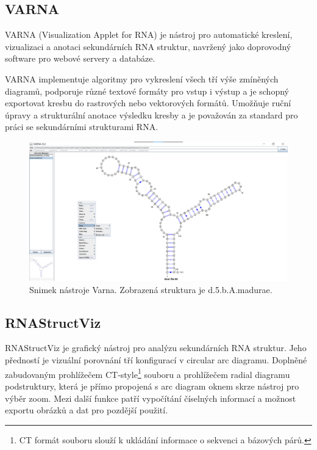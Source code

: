 \subsection{VARNA} 

VARNA (Visualization Applet for RNA) je nástroj pro automatické
kreslení, vizualizaci a anotaci sekundárních RNA struktur, navržený jako
doprovodný software pro webové servery a databáze.

VARNA implementuje algoritmy pro vykreslení všech tří výše zmíněných diagramů,
podporuje různé textové formáty pro vstup i výstup a je schopný exportovat
kresbu do rastrových nebo vektorových formátů. Umožňuje ruční úpravy a
strukturální anotace výsledku kresby a je považován za standard pro práci se
sekundárními strukturami RNA.

\begin{figure}[H]
  \centering
  \includegraphics[width=140mm]{../img/kap01/varna.png}
  \caption{Snimek nástroje Varna. Zobrazená struktura je d.5.b.A.madurae.}
\end{figure}

\subsection{RNAStructViz} 

RNAStructViz\cite{RnaStructViz} je grafický nástroj pro analýzu sekundárních
RNA struktur. Jeho předností je vizuální porovnání tří konfigurací v circular
arc diagramu. Doplněné zabudovaným prohlížečem CT-style\footnote{CT formát
souboru slouží k ukládání informace o sekvenci a bázových párů.} souboru a
prohlížečem radial diagramu podstruktury, která je přímo propojená s arc
diagram oknem skrze nástroj pro výběr zoom. Mezi další funkce patří vypočítání
číselných informací a možnost exportu obrázků a dat pro pozdější použití.


